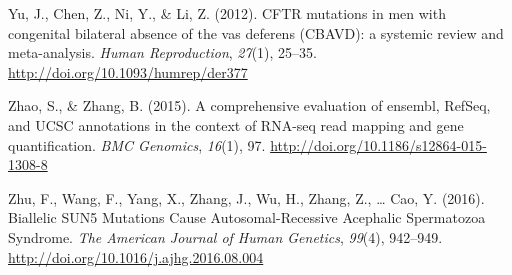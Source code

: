 \documentclass[12pt,twoside]{reedthesis}
\theoremstyle{definition}
\theoremstyle{definition}
\theoremstyle{remark}
\begin{document}
  \hypertarget{ref-Yu2012}{}
  Yu, J., Chen, Z., Ni, Y., \& Li, Z. (2012). CFTR mutations in men with
  congenital bilateral absence of the vas deferens (CBAVD): a systemic
  review and meta-analysis. \emph{Human Reproduction}, \emph{27}(1),
  25--35. \url{http://doi.org/10.1093/humrep/der377}
  
  \hypertarget{ref-Zhao2015}{}
  Zhao, S., \& Zhang, B. (2015). A comprehensive evaluation of ensembl,
  RefSeq, and UCSC annotations in the context of RNA-seq read mapping and
  gene quantification. \emph{BMC Genomics}, \emph{16}(1), 97.
  \url{http://doi.org/10.1186/s12864-015-1308-8}
  
  \hypertarget{ref-Zhu2016}{}
  Zhu, F., Wang, F., Yang, X., Zhang, J., Wu, H., Zhang, Z., \ldots{} Cao,
  Y. (2016). Biallelic SUN5 Mutations Cause Autosomal-Recessive Acephalic
  Spermatozoa Syndrome. \emph{The American Journal of Human Genetics},
  \emph{99}(4), 942--949. \url{http://doi.org/10.1016/j.ajhg.2016.08.004}


\end{document}
